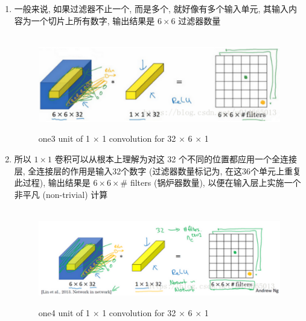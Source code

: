 \documentclass[12pt]{ctexart}%
\begin{document}
\begin{enumerate}
				 \item 一般来说, 如果过滤器不止一个, 而是多个, 就好像有多个输入单元, 其输入内容为一个切片上所有数字, 输出结果是 $6×6$ 过滤器数量
				 			\begin{figure}[H]
				 				\vspace{-0.2cm}  %
				 				\setlength{\abovecaptionskip}{-0.2cm}   %
				 				\centering
				 				\includegraphics[scale=0.5]{4_for_6_6_32.png}
				 				\renewcommand{\figurename}{Fig} %
				 				\caption{one3 unit of 1 $\times$ 1 convolution for 32 $\times$ 6 $\times$ 1}
				 				\label{fig12: one unit for 6 6 32}
				 			\end{figure}
			 
			 	\item 所以 $1 \times 1$ 卷积可以从根本上理解为对这 32 个不同的位置都应用一个全连接层, 全连接层的作用是输入32个数字 (过滤器数量标记为, 在这36个单元上重复此过程), 输出结果是 $6 \times 6 \times \#$ filters (锅炉器数量), 以便在输入层上实施一个非平凡 (non-trivial) 计算
			 				\begin{figure}[H]
			 					\vspace{-0.2cm}  %
			 					\setlength{\abovecaptionskip}{-0.2cm}   %
			 					\centering
			 					\includegraphics[scale=0.5]{5_for_6_6_32.png}
			 					\renewcommand{\figurename}{Fig} %
			 					\caption{one4 unit of 1 $\times$ 1 convolution for 32 $\times$ 6 $\times$ 1}
			 					\label{fig13: one unit for 6 6 32}
			 				\end{figure}
			 	

\end{enumerate}
\end{document}
